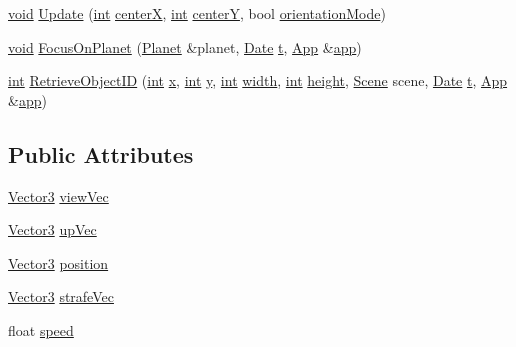 \begin{DoxyCompactItemize}
\item 
\hyperlink{wglext_8h_a9e6b7f1933461ef318bb000d6bd13b83}{void} \hyperlink{classgl_camera_a1ab1368aaf700ab1a4c38f4332a4fc0e}{Update} (\hyperlink{wglext_8h_a500a82aecba06f4550f6849b8099ca21}{int} \hyperlink{_routine_8cpp_a2ef9a98c01d810b5c65529f7a96db72c}{center\+X}, \hyperlink{wglext_8h_a500a82aecba06f4550f6849b8099ca21}{int} \hyperlink{_routine_8cpp_a02c5292ed607e9932ef7083772bd1df8}{center\+Y}, bool \hyperlink{_routine_8cpp_a3772f1f217df2a7863cc26d1d8a5bbbe}{orientation\+Mode})
\item 
\hyperlink{wglext_8h_a9e6b7f1933461ef318bb000d6bd13b83}{void} \hyperlink{classgl_camera_a7ad65ff247a29468cb939474e4c07c4b}{Focus\+On\+Planet} (\hyperlink{class_planet}{Planet} \&planet, \hyperlink{class_date}{Date} \hyperlink{glext_8h_a7d65d00ca3b0630d9b5c52df855b19f5}{t}, \hyperlink{class_app}{App} \&\hyperlink{_routine_8cpp_a05b5a24325d46227633053ca49de6234}{app})
\item 
\hyperlink{wglext_8h_a500a82aecba06f4550f6849b8099ca21}{int} \hyperlink{classgl_camera_a1be4621c5b94b057920b3a2a27adb99b}{Retrieve\+Object\+I\+D} (\hyperlink{wglext_8h_a500a82aecba06f4550f6849b8099ca21}{int} \hyperlink{glext_8h_ad77deca22f617d3f0e0eb786445689fc}{x}, \hyperlink{wglext_8h_a500a82aecba06f4550f6849b8099ca21}{int} \hyperlink{glext_8h_a9298c7ad619074f5285b32c6b72bfdea}{y}, \hyperlink{wglext_8h_a500a82aecba06f4550f6849b8099ca21}{int} \hyperlink{glext_8h_aa105b18f96e6bc2485cb7f576a7fb9ba}{width}, \hyperlink{wglext_8h_a500a82aecba06f4550f6849b8099ca21}{int} \hyperlink{glext_8h_aa214bd63e12f7ddf524c83894fcc69a7}{height}, \hyperlink{class_scene}{Scene} scene, \hyperlink{class_date}{Date} \hyperlink{glext_8h_a7d65d00ca3b0630d9b5c52df855b19f5}{t}, \hyperlink{class_app}{App} \&\hyperlink{_routine_8cpp_a05b5a24325d46227633053ca49de6234}{app})
\end{DoxyCompactItemize}
\subsection*{Public Attributes}
\begin{DoxyCompactItemize}
\item 
\hyperlink{class_vector3}{Vector3} \hyperlink{classgl_camera_a2d6263fab021ec81f9f13582f8bdcb9b}{view\+Vec}
\item 
\hyperlink{class_vector3}{Vector3} \hyperlink{classgl_camera_a361375f29cfc87acae069ec5b45f56f4}{up\+Vec}
\item 
\hyperlink{class_vector3}{Vector3} \hyperlink{classgl_camera_a4e7a84b7ccc0840f436d9792c5429c2b}{position}
\item 
\hyperlink{class_vector3}{Vector3} \hyperlink{classgl_camera_a8d5190bd0b8078e6b653904f9fc84687}{strafe\+Vec}
\item 
float \hyperlink{classgl_camera_a78fc5959743b15b58b90fb747642fee2}{speed}
\end{DoxyCompactItemize}


